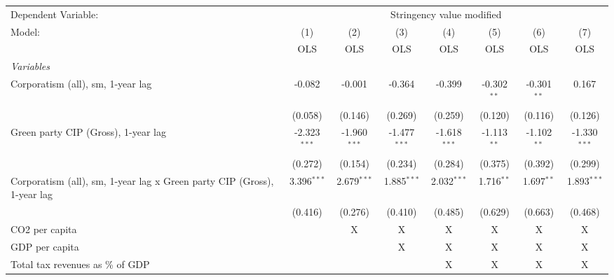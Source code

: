 
\begingroup
\centering
\begin{tabular}{lccccccc}
   \toprule
   Dependent Variable: & \multicolumn{7}{c}{Stringency value modified}\\
   Model:                                                                  & (1)            & (2)            & (3)            & (4)            & (5)           & (6)           & (7)\\  
                                                                           &  OLS           & OLS            & OLS            & OLS            & OLS           & OLS           & OLS\\  
   \midrule
   \emph{Variables}\\
   Corporatism (all), sm, 1-year lag                                       & -0.082         & -0.001         & -0.364         & -0.399         & -0.302$^{**}$ & -0.301$^{**}$ & 0.167\\   
                                                                           & (0.058)        & (0.146)        & (0.269)        & (0.259)        & (0.120)       & (0.116)       & (0.126)\\   
   Green party CIP (Gross), 1-year lag                                     & -2.323$^{***}$ & -1.960$^{***}$ & -1.477$^{***}$ & -1.618$^{***}$ & -1.113$^{**}$ & -1.102$^{**}$ & -1.330$^{***}$\\   
                                                                           & (0.272)        & (0.154)        & (0.234)        & (0.284)        & (0.375)       & (0.392)       & (0.299)\\   
   Corporatism (all), sm, 1-year lag x Green party CIP (Gross), 1-year lag & 3.396$^{***}$  & 2.679$^{***}$  & 1.885$^{***}$  & 2.032$^{***}$  & 1.716$^{**}$  & 1.697$^{**}$  & 1.893$^{***}$\\   
                                                                           & (0.416)        & (0.276)        & (0.410)        & (0.485)        & (0.629)       & (0.663)       & (0.468)\\   
   CO2 per capita                                                          &                & X              & X              & X              & X             & X             & X\\  
   GDP per capita                                                          &                &                & X              & X              & X             & X             & X\\  
   Total tax revenues as \% of GDP                                         &                &                &                & X              & X             & X             & X\\  

\end{tabular}

